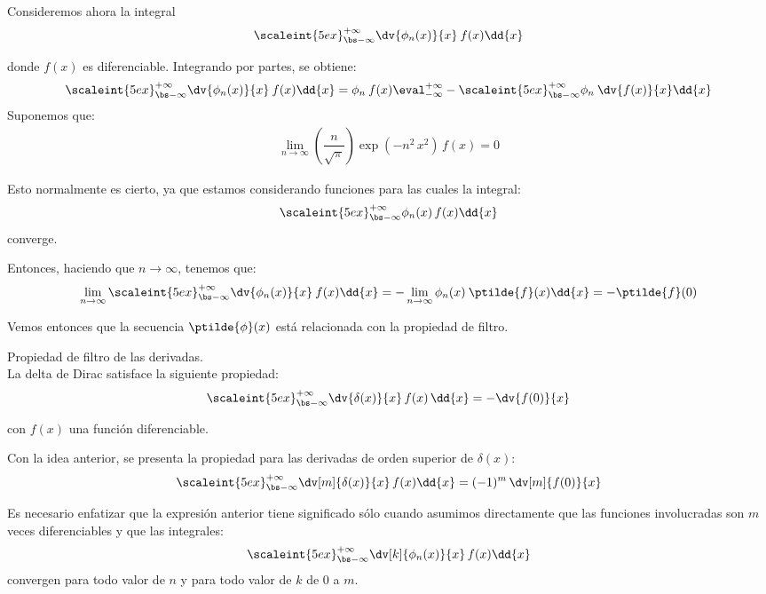 Consideremos ahora la integral
\begin{align*}
\scaleint{5ex}_{\bs -\infty}^{+\infty} \dv{\phi_{n}(x)}{x} \: f(x) \dd{x}
\end{align*}

donde $f(x)$ es diferenciable. Integrando por partes, se obtiene:
\begin{align*}
\scaleint{5ex}_{\bs -\infty}^{+\infty} \dv{\phi_{n}(x)}{x} \: f(x) \dd{x} = \phi_{n} \: f(x) \eval_{-\infty}^{+\infty} - \scaleint{5ex}_{\bs -\infty}^{+\infty} \phi_{n} \: \dv{f(x)}{x} \dd{x}
\end{align*}
Suponemos que:
\begin{align*}
\lim_{n \to \infty} \left( \dfrac{n}{\sqrt{\pi}} \right) \exp(-n^{2} \, x^{2}) \, f(x) = 0
\end{align*}

Esto normalmente es cierto, ya que estamos considerando funciones para las cuales la integral:
\begin{align*}
\scaleint{5ex}_{\bs -\infty}^{+\infty} \phi_{n}(x) \, f(x) \dd{x} 
\end{align*}
converge.
\par
Entonces, haciendo que $n \to \infty$, tenemos que:
\begin{align*}
\lim_{n \to \infty} \scaleint{5ex}_{\bs -\infty}^{+\infty} \dv{\phi_{n}(x)}{x} \: f(x) \dd{x} = - \lim_{n \to \infty} \phi_{n}(x) \: \ptilde{f} (x) \dd{x} =  - \ptilde{f}(0)
\end{align*}

Vemos entonces que la secuencia $\ptilde{\phi}(x)$ está relacionada con la propiedad de filtro.

\begin{propiedad}
Propiedad de filtro de las derivadas.
\\
La delta de Dirac satisface la siguiente propiedad:
\begin{align*}
\scaleint{5ex}_{\bs -\infty}^{+\infty} \dv{\delta(x)}{x} \, f(x) \, \dd{x} = - \dv{f(0)}{x}
\end{align*}

con $f(x)$ una función diferenciable.
\par
Con la idea anterior, se presenta la propiedad para las derivadas de orden superior de $\delta (x)$:
\begin{align*}
\scaleint{5ex}_{\bs -\infty}^{+\infty} \dv[m]{\delta (x)}{x} \, f(x) \dd{x} =  (-1)^{m} \, \dv[m]{f(0)}{x}
\end{align*}

Es necesario enfatizar que la expresión anterior tiene significado sólo cuando asumimos directamente que las funciones involucradas son $m$ veces diferenciables y que las integrales:
\begin{align*}
\scaleint{5ex}_{\bs -\infty}^{+\infty} \dv[k]{\phi_{n}(x)}{x} \, f(x) \dd{x}
\end{align*}
convergen para todo valor de $n$ y para todo valor de $k$ de $0$ a $m$.
\end{propiedad}

